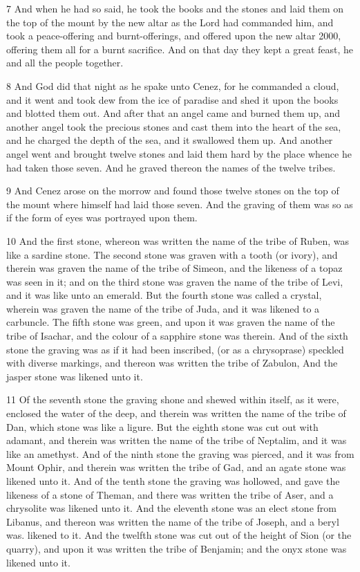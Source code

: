 \par 7 And when he had so said, he took the books and the stones and laid them on the top of the mount by the new altar as the Lord had commanded him, and took a peace-offering and burnt-offerings, and offered upon the new altar 2000, offering them all for a burnt sacrifice. And on that day they kept a great feast, he and all the people together. 

\par 8 And God did that night as he spake unto Cenez, for he commanded a cloud, and it went and took dew from the ice of paradise and shed it upon the books and blotted them out. And after that an angel came and burned them up, and another angel took the precious stones and cast them into the heart of the sea, and he charged the depth of the sea, and it swallowed them up. And another angel went and brought twelve stones and laid them hard by the place whence he had taken those seven. And he graved thereon the names of the twelve tribes.

\par 9 And Cenez arose on the morrow and found those twelve stones on the top of the mount where himself had laid those seven. And the graving of them was so as if the form of eyes was portrayed upon them.

\par 10 And the first stone, whereon was written the name of the tribe of Ruben, was like a sardine stone. The second stone was graven with a tooth (or ivory), and therein was graven the name of the tribe of Simeon, and the likeness of a topaz was seen in it; and on the third stone was graven the name of the tribe of Levi, and it was like unto an emerald. But the fourth stone was called a crystal, wherein was graven the name of the tribe of Juda, and it was likened to a carbuncle. The fifth stone was green, and upon it was graven the name of the tribe of Isachar, and the colour of a sapphire stone was therein. And of the sixth stone the graving was as if it had been inscribed, (or as a chrysoprase) speckled with diverse markings, and thereon was written the tribe of Zabulon, And the jasper stone was likened unto it.

\par 11 Of the seventh stone the graving shone and shewed within itself, as it were, enclosed the water of the deep, and therein was written the name of the tribe of Dan, which stone was like a ligure. But the eighth stone was cut out with adamant, and therein was written the name of the tribe of Neptalim, and it was like an amethyst. And of the ninth stone the graving was pierced, and it was from Mount Ophir, and therein was written the tribe of Gad, and an agate stone was likened unto it. And of the tenth stone the graving was hollowed, and gave the likeness of a stone of Theman, and there was written the tribe of Aser, and a chrysolite was likened unto it. And the eleventh stone was an elect stone from Libanus, and thereon was written the name of the tribe of Joseph, and a beryl was. likened to it. And the twelfth stone was cut out of the height of Sion (or the quarry), and upon it was written the tribe of Benjamin; and the onyx stone was likened unto it.

